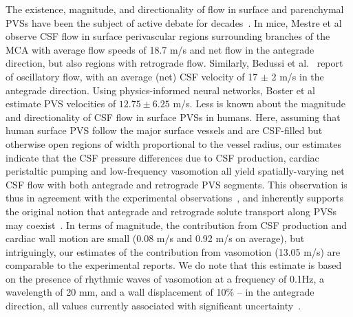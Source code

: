 \documentclass[fleqn,10pt]{wlscirep}
\begin{document}
The existence, magnitude, and directionality of flow in surface and
parenchymal PVSs have been the subject of active debate for
decades~\cite{rennels1985evidence, bilston2003arterial,
  hadaczek2006perivascular, carare2008solutes, iliff2012paravascular,
  iliff2013cerebral, bakker2016lymphatic, mestre2018flow,
  bedussi2018paravascular, rey2018pulsatile, thomas2019fluid,
  daversin2020mechanisms, kedarasetti2020functional,
  martinac2021phase, vanveluw2020vasomotion, bohr2022glymphatic,
  boster2023artificial, gjerde2023directional,
  nozaleda2024arterial}. In mice, Mestre et al~\cite{mestre2018flow}
observe CSF flow in surface perivascular regions surrounding branches
of the MCA with average flow speeds of 18.7 \textmu m/s and net flow
in the antegrade direction, but also regions with retrograde
flow. Similarly, Bedussi et al.~\cite{bedussi2018paravascular} report
of oscillatory flow, with an average (net) CSF velocity of 17 $\pm$ 2
\textmu m/s in the antegrade direction. Using physics-informed neural
networks, Boster et al~\cite{boster2023artificial} estimate PVS
velocities of $12.75 \pm 6.25$ \textmu m/s. Less is known about the
magnitude and directionality of CSF flow in surface PVSs in
humans. Here, assuming that human surface PVS follow the major surface
vessels and are CSF-filled but otherwise open regions of width
proportional to the vessel radius, our estimates indicate that the CSF
pressure differences due to CSF production, cardiac peristaltic
pumping and low-frequency vasomotion all yield spatially-varying net
CSF flow with both antegrade and retrograde PVS segments. This
observation is thus in agreement with the experimental
observations~\cite{mestre2018flow, bedussi2018paravascular}, and
inherently supports the original notion that antegrade and retrograde
solute transport along PVSs may coexist~\cite{rennels1985evidence}. In
terms of magnitude, the contribution from CSF production and cardiac
wall motion are small (0.08 \textmu m/s and 0.92 \textmu m/s on
average), but intriguingly, our estimates of the contribution from
vasomotion (13.05 \textmu m/s) are comparable to the experimental
reports. We do note that this estimate is based on the presence of
rhythmic waves of vasomotion at a frequency of 0.1Hz, a wavelength of
20 mm, and a wall displacement of 10\% -- in the antegrade direction,
all values currently associated with significant
uncertainty~\cite{gokina1996electrical, vanveluw2020vasomotion,
  broggini2024long}.
\end{document}
